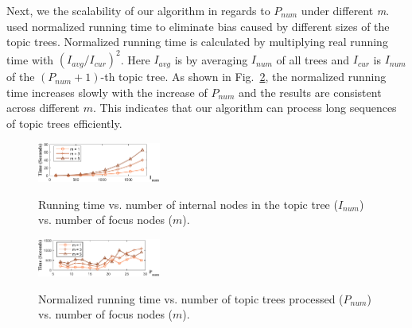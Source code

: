 Next, we  the scalability of our algorithm in regards to $P_{num}$ under different \emph{\normalsize m}.
 used  normalized running time to eliminate  bias caused by different sizes of the topic trees.
Normalized running time is calculated by multiplying real running time with $(I_{avg}/I_{cur})^2$.
Here $I_{avg}$ is  by averaging $I_{num}$ of all trees and $I_{cur}$ is $I_{num}$ of the $(P_{num}+1)$-th topic tree.
As shown in Fig.~\ref{fig:exp-time-Pnum}, the normalized running time increases slowly with the increase of $P_{num}$ and the results are consistent across different $m$.
This indicates that our algorithm can process long sequences of topic trees efficiently.

\begin{figure}[t]
\centering
{
\includegraphics[width=0.36\textwidth]{fig/TotalTime-TopicNumber.pdf}
}
\caption{Running time vs. number of internal nodes in the topic tree ($I_{num}$) vs. number of focus nodes ($m$).}
\label{fig:exp-time-Inum}
\vspace{-1mm}
\end{figure}


\begin{figure}[t]
\centering
{
\includegraphics[width=0.36\textwidth]{fig/TotalTime-TreeCount.pdf}
}
\caption{Normalized running time vs. number of topic trees processed ($P_{num}$) vs. number of focus nodes ($m$).}
\label{fig:exp-time-Pnum}
\vspace{-5mm}
\end{figure}

